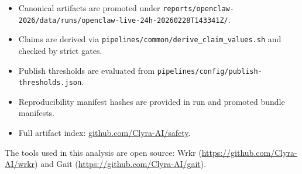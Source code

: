 \documentclass[
]{article}
\providecommand{\tightlist}{%
  \setlength{\itemsep}{0pt}\setlength{\parskip}{0pt}}
\begin{document}
\begin{itemize}
\tightlist
\item
  Canonical artifacts are promoted under
  \texttt{reports/openclaw-2026/data/runs/openclaw-live-24h-20260228T143341Z/}.
\item
  Claims are derived via
  \texttt{pipelines/common/derive\_claim\_values.sh} and checked by
  strict gates.
\item
  Publish thresholds are evaluated from
  \texttt{pipelines/config/publish-thresholds.json}.
\item
  Reproducibility manifest hashes are provided in run and promoted
  bundle manifests.
\item
  Full artifact index:
  \href{https://github.com/Clyra-AI/safety}{github.com/Clyra-AI/safety}.
\end{itemize}

The tools used in this analysis are open source: Wrkr
(\url{https://github.com/Clyra-AI/wrkr}) and Gait
(\url{https://github.com/Clyra-AI/gait}).
\end{document}
